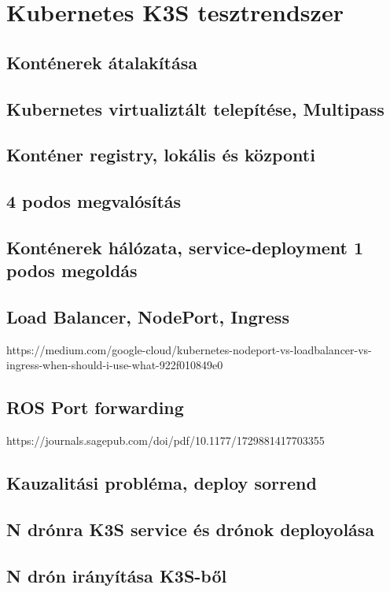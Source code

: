 
\chapter{Kubernetes K3S tesztrendszer}

\section{Konténerek átalakítása}

\section{Kubernetes virtualiztált telepítése, Multipass}

\section{Konténer registry, lokális és központi}

\section{4 podos megvalósítás}

\section{Konténerek hálózata, service-deployment 1 podos megoldás}

\section{Load Balancer, NodePort, Ingress}
https://medium.com/google-cloud/kubernetes-nodeport-vs-loadbalancer-vs-ingress-when-should-i-use-what-922f010849e0

\section{ROS Port forwarding}
https://journals.sagepub.com/doi/pdf/10.1177/1729881417703355

\section{Kauzalitási probléma, deploy sorrend}

\section{N drónra K3S service és drónok deployolása}

\section{N drón irányítása K3S-ből}
